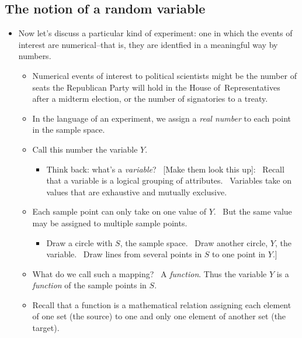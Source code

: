 \documentclass[11pt]{article}
\begin{document}
\subsection{The notion of a random variable}

\begin{itemize}
\item Now let's discuss a particular kind of experiment: one in which the
events of interest are numerical--that is, they are identfied in a
meaningful way by numbers. \ 

\begin{itemize}
\item Numerical events of interest to political scientists might be the
number of seats the Republican Party will hold in the House of\
Representatives after a midterm election, or the number of signatories to a
treaty.

\item In the language of an experiment, we assign a \textit{real number} to
each point in the sample space.

\item Call this number the variable $Y$.

\begin{itemize}
\item Think back: what's a \textit{variable}? \ [Make them look this up]: \
Recall that a variable is a logical grouping of attributes. \ Variables take
on values that are exhaustive and mutually exclusive. \ 
\end{itemize}

\item Each sample point can only take on one value of $Y$. \ But the same
value may be assigned to multiple sample points. \ 

\begin{itemize}
\item \lbrack Draw a circle with $S$, the sample space. \ Draw another
circle, $Y$, the variable. \ Draw lines from several points in $S$ to one
point in $Y$.]
\end{itemize}

\item What do we call such a mapping? \ A \textit{function}. Thus the
variable $Y$ is a \textit{function} of the sample points in $S$.

\item Recall that a function is a mathematical relation assigning each
element of one set (the source) to one and only one element of another set
(the target). \ 


\end{itemize}
\end{itemize}
\end{document}
